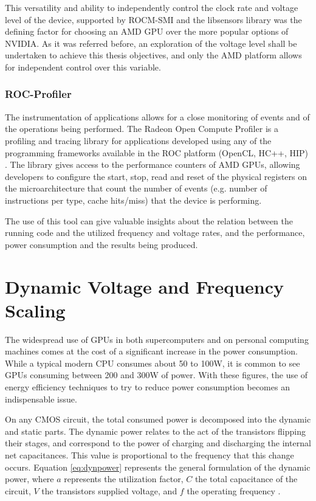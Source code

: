 This versatility and ability to independently control the clock rate and voltage level of the device, supported by ROCM-SMI and the libsensors library was the defining factor for choosing an AMD GPU over the more popular options of NVIDIA. As it was referred before, an exploration of the voltage level shall be undertaken to achieve this thesis objectives, and only the AMD platform allows for independent control over this variable.

\subsubsection{ROC-Profiler}

The instrumentation of applications allows for a close monitoring of events and of the operations being performed. The Radeon Open Compute Profiler \cite{noauthor_rocm-developer-tools/rocprofiler_2019} is a profiling and tracing library for applications developed using any of the programming frameworks available in the ROC platform (OpenCL, HC++, HIP) \cite{sun_evaluating_2018}. The library gives access to the performance counters of AMD GPUs, allowing developers to configure the start, stop, read and reset of the physical registers on the microarchitecture that count the number of events (e.g. number of instructions per type, cache hits/miss) that the device is performing.

The use of this tool can give valuable insights about the relation between the running code and the utilized frequency and voltage rates, and the performance, power consumption and the results being produced.




\section{Dynamic Voltage and Frequency Scaling}
\label{section:dcvf}

The widespread use of GPUs in both supercomputers and on personal computing machines comes at the cost of a significant increase in the power consumption. While a typical modern CPU consumes about 50 to 100W, it is common to see GPUs consuming between 200 and 300W of power. With these figures, the use of energy efficiency techniques to try to reduce power consumption becomes an indispensable issue.

On any CMOS circuit, the total consumed power is decomposed into the dynamic and static parts. The dynamic power relates to the act of the transistors flipping their stages, and correspond to the power of charging and discharging the internal net capacitances. This value is proportional to the frequency that this change occurs. Equation \ref{eq:dynpower} represents the general formulation of the dynamic power, where $a$ represents the utilization factor, $C$ the total capacitance of the circuit, $V$ the transistors supplied voltage, and $f$ the operating frequency \cite{gonzalez_supply_1997}.

